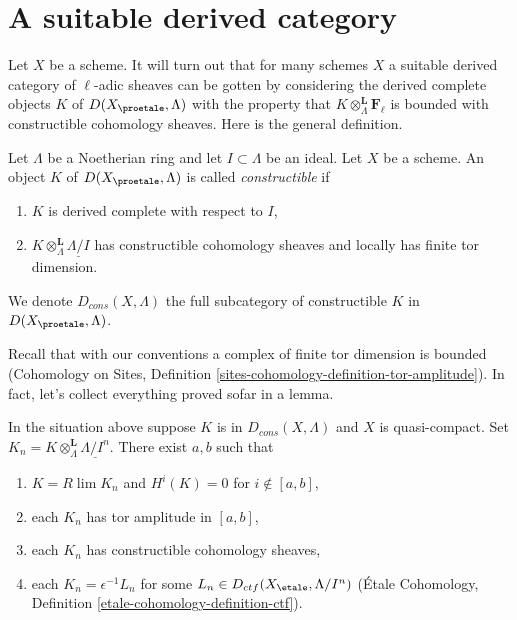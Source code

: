 \section{A suitable derived category}
\label{section-suitable-derived}

\noindent
Let $X$ be a scheme. It will turn out that for many schemes $X$ a suitable
derived category of $\ell$-adic sheaves can be gotten by considering the
derived complete objects $K$ of $D(X_\proetale, \Lambda)$ with the property
that $K \otimes_\Lambda^\mathbf{L} \mathbf{F}_\ell$ is bounded with
constructible cohomology sheaves. Here is the general definition.

\begin{definition}
\label{definition-Dbc}
Let $\Lambda$ be a Noetherian ring and let $I \subset \Lambda$ be an ideal.
Let $X$ be a scheme. An object $K$ of $D(X_\proetale, \Lambda)$ is called
{\it constructible} if
\begin{enumerate}
\item $K$ is derived complete with respect to $I$,
\item $K \otimes_\Lambda^\mathbf{L} \underline{\Lambda/I}$
has constructible cohomology sheaves and locally has finite tor dimension.
\end{enumerate}
We denote $D_{cons}(X, \Lambda)$ the full subcategory of constructible
$K$ in $D(X_\proetale, \Lambda)$.
\end{definition}

\noindent
Recall that with our conventions a complex of finite tor dimension
is bounded (Cohomology on Sites, Definition
\ref{sites-cohomology-definition-tor-amplitude}).
In fact, let's collect everything proved sofar in a lemma.

\begin{lemma}
\label{lemma-describe-constructible-complexes}
In the situation above suppose $K$ is in $D_{cons}(X, \Lambda)$
and $X$ is quasi-compact. Set
$K_n = K \otimes_\Lambda^\mathbf{L} \underline{\Lambda/I^n}$.
There exist $a, b$ such that
\begin{enumerate}
\item $K = R\lim K_n$ and $H^i(K) = 0$ for $i \not \in [a, b]$,
\item each $K_n$ has tor amplitude in $[a, b]$,
\item each $K_n$ has constructible cohomology sheaves,
\item each $K_n = \epsilon^{-1}L_n$ for some
$L_n \in D_{ctf}(X_\etale, \Lambda/I^n)$
(\'Etale Cohomology, Definition \ref{etale-cohomology-definition-ctf}).
\end{enumerate}
\end{lemma}

